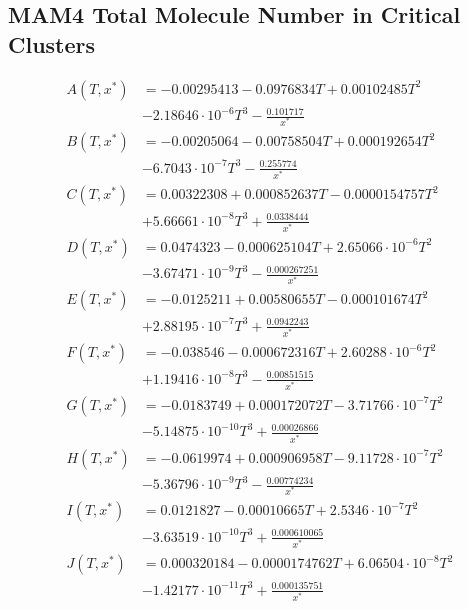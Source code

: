 \subsection{MAM4 Total Molecule Number in Critical Clusters}

\begin{align}
A(T,x^*) &= -0.00295413 - 0.0976834 T + 0.00102485 T^2 \nonumber \\
             &- 2.18646 \cdot 10^{-6} T^3 - \frac{0.101717}{x^*} \\
B(T,x^*) &= -0.00205064 - 0.00758504 T + 0.000192654 T^2 \nonumber \\
              &- 6.7043 \cdot 10^{-7} T^3 - \frac{0.255774}{x^*} \\
C(T,x^*) &= 0.00322308 + 0.000852637 T - 0.0000154757 T^2 \nonumber \\
              &+ 5.66661 \cdot 10^{-8} T^3 + \frac{0.0338444}{x^*} \\
D(T,x^*) &= 0.0474323 - 0.000625104 T + 2.65066 \cdot 10^{-6} T^2 \nonumber \\
              &- 3.67471 \cdot 10^{-9} T^3 - \frac{0.000267251}{x^*} \\
E(T,x^*) &= -0.0125211 + 0.00580655 T - 0.000101674 T^2 \nonumber \\
             &+ 2.88195 \cdot 10^{-7} T^3 + \frac{0.0942243}{x^*} \\
F(T,x^*) &= -0.038546 - 0.000672316 T + 2.60288 \cdot 10^{-6} T^2 \nonumber \\
              &+ 1.19416 \cdot 10^{-8} T^3 - \frac{0.00851515}{x^*} \\
G(T,x^*) &= -0.0183749 + 0.000172072 T - 3.71766 \cdot 10^{-7} T^2 \nonumber \\
              &- 5.14875 \cdot 10^{-10} T^3 + \frac{0.00026866}{x^*} \\
H(T,x^*) &= -0.0619974 + 0.000906958 T - 9.11728 \cdot 10^{-7} T^2 \nonumber \\
              &- 5.36796 \cdot 10^{-9} T^3 - \frac{0.00774234}{x^*} \\
I(T,x^*) &= 0.0121827 - 0.00010665 T + 2.5346 \cdot 10^{-7} T^2 \nonumber \\
             &- 3.63519 \cdot 10^{-10} T^3 + \frac{0.000610065}{x^*} \\
J(T,x^*) &= 0.000320184 - 0.0000174762 T + 6.06504 \cdot 10^{-8} T^2 \nonumber \\
             &- 1.42177 \cdot 10^{-11} T^3 + \frac{0.000135751}{x^*}
\end{align}

